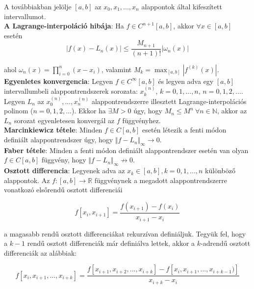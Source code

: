 \documentclass[margin=0px]{article}
\begin{document}
	\noindent A továbbiakban jelölje $[a,b]$ az $x_{0}, x_{1}, ..., x_{n}$ alappontok által kifeszített intervallumot.\\
	
	\noindent \textbf{A Lagrange-interpoláció hibája}: Ha $f \in C^{n+1}[a,b]$, akkor $\forall x \in [a,b]$ esetén
	\begin{displaymath}
		|f(x) - L_{n}(x)| \leq \frac{M_{n+1}}{(n+1)!}|\omega_{n}(x)|
	\end{displaymath}
	
	\noindent ahol $\omega_{n}(x) = \displaystyle\prod_{i=0}^{n}(x-x_{i})$, valamint $M_{k} = \displaystyle\max_{[a,b]}|f^{(k)}(x)|$.\\
	
	\noindent \textbf{Egyenletes konvergencia}: Legyen $f \in C^{\infty}[a,b]$ és legyen adva egy $[a,b]$ intervallumbeli
	alappontrendszerek sorozata: $x_{k}^{(n)}$, $k=0,1,...,n$, $n=0,1,2,...$. Legyen $L_{n}$ az $x_{0}^{(n)}, ... ,x_{n}^{(n)}$
	alappontrendszerre illesztett Lagrange-interpolációs polinom ($n=0,1,2,...$). Ekkor ha $\exists M>0$ úgy, hogy
	$M_{n} \leq M^{n} \ \forall n \in \mathbb{N}$, akkor az $L_{n}$ sorozat egyenletesen konvergál az $f$ függvényhez.\\

	\noindent \textbf{Marcinkiewicz tétele}: Minden $f \in C[a,b]$ esetén létezik a fenti módon definiált alappontrendszer
	úgy, hogy $\Vert f - L_{n}\Vert_{\infty} \to 0$.\\
	
	\noindent \textbf{Faber tétele}: Minden a fenti módon definiált alappontrendszer esetén van olyan $f \in C[a,b]$ függvény,
	hogy $\Vert f - L_{n}\Vert_{\infty} \not \to 0$.\\

	\noindent \textbf{Osztott differencia}: Legyenek adva az $x_{k} \in [a,b], k=0,1,...,n$ különböző alappontok.
	Az $f:[a,b] \to \mathbb{R}$ függvénynek a megadott alappontrendszerre vonatkozó elsőrendű osztott differenciái
	
	\begin{displaymath}
		f[x_{i},x_{i+1}] = \frac{f(x_{i+1})-f(x_{i})}{x_{i+1} - x_{i}}
	\end{displaymath}
	
	\noindent a magasabb rendű osztott differenciákat rekurzívan definiáljuk. Tegyük fel, hogy a $k-1$ rendű osztott differenciák
	már definiálva lettek, akkor a $k$-adrendű osztott differenciák az alábbiak:
	
	\begin{displaymath}
		f[x_{i},x_{i+1},...,x_{i+k}] = \frac{f[x_{i+1},x_{i+2}, ..., x_{i+k}]-f[x_{i},x_{i+1}, ..., x_{i+k-1})]}{x_{i+k} - x_{i}}
	\end{displaymath}
	
\end{document}
